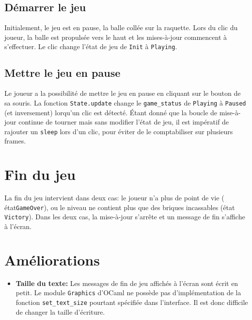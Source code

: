 \documentclass[french]{template}
\begin{document}
\subsection{Démarrer le jeu}

Initialement, le jeu est en pause, la balle collée sur la raquette. Lors du clic du joueur, la balle est propulsée vers le haut et les mises-à-jour commencent à s'effectuer. Le clic change l'état de jeu de \texttt{Init} à \texttt{Playing}.

\subsection{Mettre le jeu en pause}

Le joueur a la possibilité de mettre le jeu en pause en cliquant sur le bouton de sa souris. La fonction \texttt{State.update} change le \texttt{game\_status} de \texttt{Playing} à \texttt{Paused} (et inversement) lorqu'un clic est détecté. Étant donné que la boucle de mise-à-jour continue de tourner mais sans modifier l'état de jeu, il est impératif de rajouter un \texttt{sleep} lors d'un clic, pour éviter de le comptabiliser sur plusieurs frames.

\section{Fin du jeu}

La fin du jeu intervient dans deux cas: le joueur n'a plus de point de vie ( état\texttt{GameOver}), ou le niveau ne contient plus que des briques incassables (état \texttt{Victory}). Dans les deux cas, la mise-à-jour s'arrête et un message de fin s'affiche à l'écran.

\section{Améliorations}

\begin{itemize}
    \item \textbf{Taille du texte:} Les messages de fin de jeu affichés à l'écran sont écrit en petit. Le module \texttt{Graphics} d'OCaml ne possède pas d'implémentation de la fonction \texttt{set\_text\_size} pourtant spécifiée dans l'interface. Il est donc difficile de changer la taille d'écriture.
\end{itemize}
\end{document}
